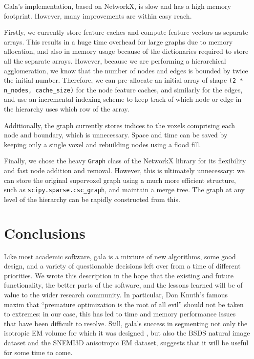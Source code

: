 \documentclass{frontiersSCNS} %
\begin{document}
Gala's implementation, based on NetworkX, is slow and has a high memory footprint.
However, many improvements are within easy reach.

Firstly, we currently store feature caches and compute feature vectors as separate arrays.
This results in a huge time overhead for large graphs due to memory allocation, and also in memory usage because of the dictionaries required to store all the separate arrays.
However, because we are performing a hierarchical agglomeration, we know that the number of nodes and edges is bounded by twice the initial number.
Therefore, we can pre-allocate an initial array of shape \texttt{\small (2 * n\_nodes, cache\_size)} for the node feature caches, and similarly for the edges, and use an incremental indexing scheme to keep track of which node or edge in the hierarchy uses which row of the array.

Additionally, the graph currently stores indices to the voxels comprising each node and boundary, which is unnecessary.
Space and time can be saved by keeping only a single voxel and rebuilding nodes using a flood fill.

Finally, we chose the heavy \texttt{\small Graph} class of the NetworkX library for its flexibility and fast node addition and removal.
However, this is ultimately unnecessary: we can store the original supervoxel graph using a much more efficient structure, such as \texttt{\small scipy.sparse.csc\_graph}, and maintain a merge tree.
The graph at any level of the hierarchy can be rapidly constructed from this.

\section{Conclusions}

Like most academic software, gala is a mixture of new algorithms, some good design, and a variety of questionable decisions left over from a time of different priorities.
We wrote this description in the hope that the existing and future functionality, the better parts of the software, and the lessons learned will be of value to the wider research community.
In particular, Don Knuth's famous maxim that ``premature optimization is the root of all evil'' \citep{knuth74opt} should not be taken to extremes: in our case, this has led to time and memory performance issues that have been difficult to resolve.
Still, gala's success in segmenting not only the isotropic EM volume for which it was designed \citep{Glasner:2011uk, NunezIglesias:2013cd}, but also the BSDS natural image dataset and the SNEMI3D anisotropic EM dataset, suggests that it will be useful for some time to come.
\end{document}

